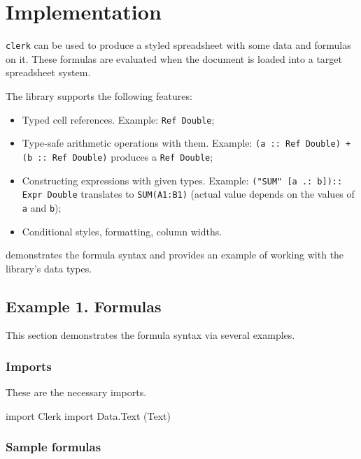 


\chapter{Implementation}
\label{chap:impl}

\texttt{clerk} can be used to produce a styled spreadsheet with some data and formulas on it. These formulas are evaluated when the document is loaded into a target spreadsheet system.

The library supports the following features:

\begin{itemize}
  \item Typed cell references. Example: \texttt{Ref Double};
  \item Type-safe arithmetic operations with them. Example: \texttt{(a :: Ref Double) + (b :: Ref Double)} produces a \texttt{Ref Double};
  \item Constructing expressions with given types. Example: \texttt{("SUM" [a .: b]):: Expr Double} translates to \texttt{SUM(A1:B1)} (actual value depends on the values of \texttt{a} and \texttt{b});
  \item Conditional styles, formatting, column widths.
\end{itemize}

 demonstrates the formula syntax and  provides an example of working with the library's data types.

\section{Example 1. Formulas}
\label{sec:ex1}

This section demonstrates the formula syntax via several examples.

\subsection{Imports}

These are the necessary imports.

\begin{mycode}
import Clerk
import Data.Text (Text)
\end{mycode}

\subsection{Sample formulas}

